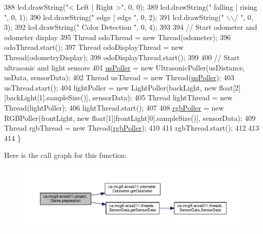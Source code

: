 \begin{DoxyCode}
388     lcd.drawString("<  Left  |  Right >", 0, 0);
389     lcd.drawString(" falling | rising  ", 0, 1);
390     lcd.drawString("  edge   |  edge   ", 0, 2);
391     lcd.drawString("        \(\backslash\)\(\backslash\)/        ", 0, 3);
392     lcd.drawString("  Color Detection  ", 0, 4);
393 
394     \textcolor{comment}{// Start odometer and odometer display}
395     Thread odoThread = new Thread(odometer);
396     odoThread.start();
397     Thread odoDisplayThread = new Thread(odometryDisplay);
398     odoDisplayThread.start();
399 
400     \textcolor{comment}{// Start ultrasonic and light sensors}
401     \hyperlink{enumca_1_1mcgill_1_1ecse211_1_1project_1_1_game_af6fee74efff891793b32352caa110465}{usPoller} = new UltrasonicPoller(usDistance, usData, sensorData);
402     Thread usThread = new Thread(\hyperlink{enumca_1_1mcgill_1_1ecse211_1_1project_1_1_game_af6fee74efff891793b32352caa110465}{usPoller});
403     usThread.start();
404     lightPoller = new LightPoller(backLight, new \textcolor{keywordtype}{float}[2][backLight[1].sampleSize()], sensorData);
405     Thread lightThread = new Thread(lightPoller);
406     lightThread.start();
407 
408     \hyperlink{enumca_1_1mcgill_1_1ecse211_1_1project_1_1_game_af24a953a0c3438670220dde36c532b5d}{rgbPoller} = new RGBPoller(frontLight, new \textcolor{keywordtype}{float}[1][frontLight[0].sampleSize()], sensorData);
409     Thread rgbThread = new Thread(\hyperlink{enumca_1_1mcgill_1_1ecse211_1_1project_1_1_game_af24a953a0c3438670220dde36c532b5d}{rgbPoller});
410     
411     rgbThread.start();
412     
413    
414   \}
\end{DoxyCode}
Here is the call graph for this function\+:\nopagebreak
\begin{figure}[H]
\begin{center}
\leavevmode
\includegraphics[width=350pt]{enumca_1_1mcgill_1_1ecse211_1_1project_1_1_game_a8f3c5b18f98ee56f5f03afd72fa40bcb_cgraph}
\end{center}
\end{figure}
\mbox{\label{enumca_1_1mcgill_1_1ecse211_1_1project_1_1_game_a032b53e9b16b9d470b461de4a311a698}} 
